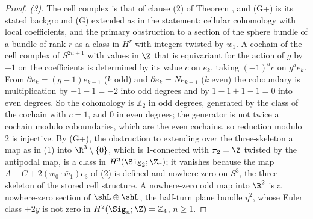 \begin{proof}
\emph{(3).} The cell complex is that of clause (2) of Theorem , and (G+) is its stated background (G) extended as in the statement: cellular cohomology with local coefficients, and the primary obstruction to a section of the sphere bundle of a bundle of rank $r$ as a class in $H^{r}$ with integers twisted by $w_{1}$. A cochain of the cell complex of $S^{2n+1}$ with values in $\Z$ that is equivariant for the action of $g$ by $-1$ on the coefficients is determined by its value $c$ on $e_{k}$, taking $(-1)^{a}c$ on $g^{a}e_{k}$. From $\partial e_{k} = (g - 1)e_{k-1}$ ($k$ odd) and $\partial e_{k} = Ne_{k-1}$ ($k$ even) the coboundary is multiplication by $-1 - 1 = -2$ into odd degrees and by $1 - 1 + 1 - 1 = 0$ into even degrees. So the cohomology is $\mathbb{Z}_{2}$ in odd degrees, generated by the class of the cochain with $c = 1$, and $0$ in even degrees; the generator is not twice a cochain modulo coboundaries, which are the even cochains, so reduction modulo $2$ is injective. By (G+), the obstruction to extending over the three-skeleton a map as in (1) into $\R^{3} \setminus \{0\}$, which is $1$-connected with $\pi_{2} = \Z$ twisted by the antipodal map, is a class in $H^{3}(\Sig_{2}; \Z_{x})$; it vanishes because the map $A - C + 2(w_{0}\cdot \bar w_{1})e_{3}$ of (2) is defined and nowhere zero on $S^{3}$, the three-skeleton of the stored cell structure. A nowhere-zero odd map into $\R^{2}$ is a nowhere-zero section of $\shL \oplus \shL$, the half-turn plane bundle $\eta^{2}$, whose Euler class $\pm 2y$ is not zero in $H^{2}(\Sig_{n}; \Z) = \mathbb{Z}_{4}$, $n \geq 1$.


\end{proof}
